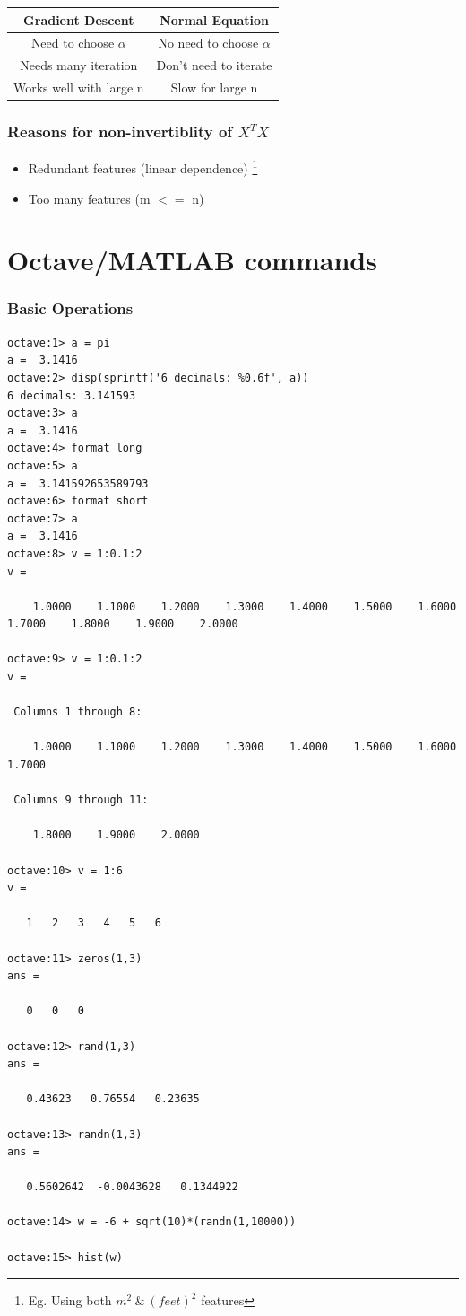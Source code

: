 \documentclass[12pt]{report}
\begin{document}
  \begin{tabular}{ |c|c|}
  	\hline
  	\textbf{Gradient Descent} & \textbf{Normal Equation} \\
  	\hline
  	Need to choose $\alpha$ & No need to choose $\alpha$ \\
  	Needs many iteration & Don't need to iterate \\
  	Works well with large n & Slow for large n \\
  	\hline
  \end{tabular}

  \vspace{5mm}

  \subsubsection{Reasons for non-invertiblity of $X^T X$}
    \begin{itemize}
    	\item Redundant features (linear dependence) \footnote[3]{Eg. Using both $m^2 \  \& \  (feet)^2$ features}
    	\item Too many features (m $<=$ n) 
    \end{itemize}

\section{Octave/MATLAB commands}

\subsubsection{Basic Operations}
\begin{lstlisting}[basicstyle=\small]
octave:1> a = pi
a =  3.1416
octave:2> disp(sprintf('6 decimals: %0.6f', a))
6 decimals: 3.141593
octave:3> a
a =  3.1416
octave:4> format long
octave:5> a
a =  3.141592653589793
octave:6> format short
octave:7> a
a =  3.1416
octave:8> v = 1:0.1:2
v =

    1.0000    1.1000    1.2000    1.3000    1.4000    1.5000    1.6000    1.7000    1.8000    1.9000    2.0000

octave:9> v = 1:0.1:2
v =

 Columns 1 through 8:

    1.0000    1.1000    1.2000    1.3000    1.4000    1.5000    1.6000    1.7000

 Columns 9 through 11:

    1.8000    1.9000    2.0000

octave:10> v = 1:6
v =

   1   2   3   4   5   6

octave:11> zeros(1,3)
ans =

   0   0   0

octave:12> rand(1,3)
ans =

   0.43623   0.76554   0.23635

octave:13> randn(1,3)
ans =

   0.5602642  -0.0043628   0.1344922

octave:14> w = -6 + sqrt(10)*(randn(1,10000))

octave:15> hist(w)
\end{lstlisting}
\end{document}
